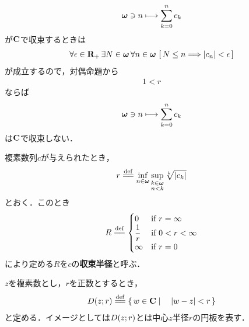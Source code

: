\begin{sketch}
		\begin{align}
			{\boldsymbol \omega} \ni n \longmapsto \sum_{k=0}^{n} c_{k}
		\end{align}
		が$\mathbf{C}$で収束するときは
		\begin{align}
			\forall \epsilon \in \mathbf{R}_+\, \exists N \in {\boldsymbol \omega}\, \forall n \in {\boldsymbol \omega}\,
			\left[\, N \leq n \Longrightarrow |c_{n}| < \epsilon\, \right]
		\end{align}
		が成立するので，対偶命題から
		\begin{align}
			1 < r
		\end{align}
		ならば
		\begin{align}
			{\boldsymbol \omega} \ni n \longmapsto \sum_{k=0}^{n} c_{k}
		\end{align}
		は$\mathbf{C}$で収束しない．
		\QED
	\end{sketch}
	
	\begin{screen}
		\begin{dfn}[収束半径]
			複素数列$c$が与えられたとき，
			\begin{align}
				r \defeq \inf{n \in \Natural}{\sup{\substack{k \in \Natural \\ n < k}}{\sqrt[k]{|c_{k}|}}}
			\end{align}
			とおく．このとき
			\begin{align}
				R \defeq
				\begin{cases}
					0 & \mbox{if } r = \infty \\
					\displaystyle{\frac{1}{r}} & \mbox{if } \displaystyle{0 < r < \infty} \\
					\infty & \mbox{if } r = 0
				\end{cases}
			\end{align}
			により定める$R$を$c$の{\bf 収束半径}と呼ぶ．
		\end{dfn}
	\end{screen}
	
	$z$を複素数とし，$r$を正数とするとき，
	\begin{align}
		\disc{z}{r} \defeq \Set{w \in \C}{|w - z| < r}
	\end{align}
	と定める．イメージとしては$D(z;r)$とは中心$z$半径$r$の円板を表す．
	
